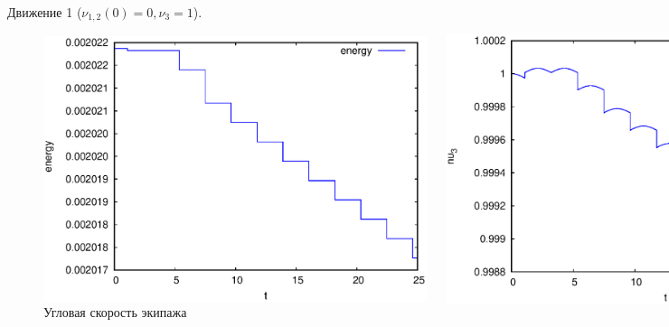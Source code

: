 
\begin{frame}{Движение 1 ($\nu_{1,2}(0) = 0, \nu_3 = 1$).}
    \begin{figure}[H]
        \centering
        \begin{columns}
                \centering
                \includegraphics[width=\linewidth]{content/pic/self_rot_25/kin_en.eps}
                \vspace{-15pt}
                \caption{Кинетическая энергия}
                \centering
                \includegraphics[width=\linewidth]{content/pic/self_rot_25/nu3.eps}
                \vspace{-15pt}
                \caption{Угловая скорость экипажа}
                \centering

\end{columns}
\end{figure}
\end{frame}
